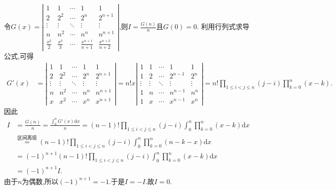 \documentclass[../../main.tex]{subfiles}
\begin{document}
\begin{solution}
令\(G(x)=\left|\begin{matrix}
1 & 1 & \cdots & 1 & 1\\
2 & 2^2 & \cdots & 2^n & 2^{n + 1}\\
\vdots & \vdots & \ddots & \vdots & \vdots\\
n & n^2 & \cdots & n^n & n^{n + 1}\\
\frac{x^2}{2} & \frac{x^3}{3} & \cdots & \frac{x^{n + 1}}{n + 1} & \frac{x^{n + 2}}{n + 2}
\end{matrix}\right|\),则\(I = \frac{G(n)}{n}\)且\(G(0) = 0\).      
利用行列式求导公式,可得
\begin{align*}
G'(x)&=\left|\begin{matrix}
1 & 1 & \cdots & 1 & 1\\
2 & 2^2 & \cdots & 2^n & 2^{n + 1}\\
\vdots & \vdots & \ddots & \vdots & \vdots\\
n & n^2 & \cdots & n^n & n^{n + 1}\\
x & x^2 & \cdots & x^n & x^{n + 1}
\end{matrix}\right|
= n!x\left|\begin{matrix}
1 & 1 & \cdots & 1 & 1\\
1 & 2 & \cdots & 2^{n - 1} & 2^n\\
\vdots & \vdots & \ddots & \vdots & \vdots\\
1 & n & \cdots & n^{n - 1} & n^n\\
1 & x & \cdots & x^{n - 1} & x^n
\end{matrix}\right|
= n!\prod_{1\leqslant i < j\leqslant n}(j - i)\prod_{k = 0}^{n}(x - k).
\end{align*}
因此
\begin{align*}
I &= \frac{G(n)}{n}=\frac{\int_{0}^{n}G'(x)\mathrm{d}x}{n}=(n - 1)!\prod_{1\leqslant i < j\leqslant n}(j - i)\int_{0}^{n}\prod_{k = 0}^{n}(x - k)\mathrm{d}x
\\
&\stackrel{\text{区间再现}}{=}(n - 1)!\prod_{1\leqslant i < j\leqslant n}(j - i)\int_{0}^{n}\prod_{k = 0}^{n}(n - k - x)\mathrm{d}x
\\
&= (-1)^{n + 1}(n - 1)!\prod_{1\leqslant i < j\leqslant n}(j - i)\int_{0}^{n}\prod_{k = 0}^{n}(x - k)\mathrm{d}x
\\
&= (-1)^{n + 1}I.
\end{align*}      
由于\(n\)为偶数,所以\((-1)^{n + 1} = -1\).于是\(I = -I\).故\(I = 0\). 

\end{solution}
\end{document}
